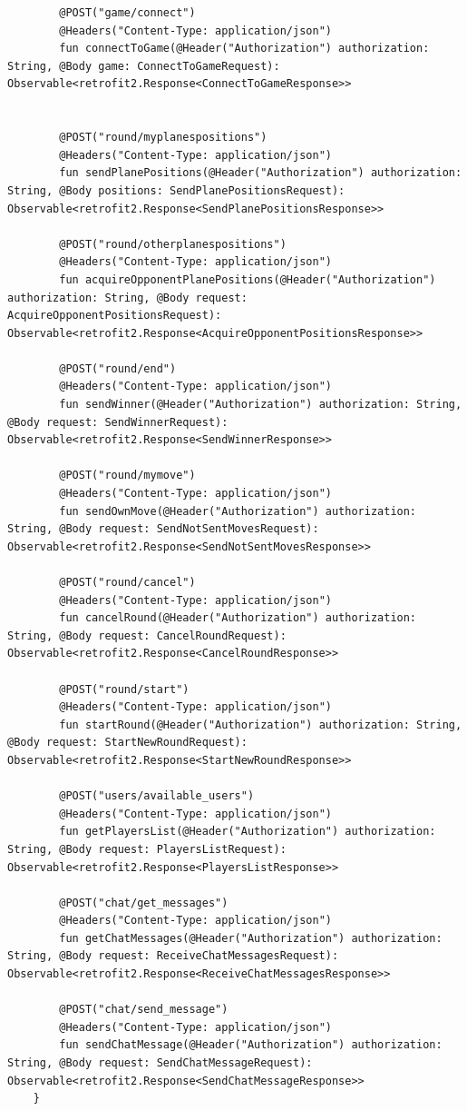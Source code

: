 \begin{lstlisting}
		@POST("game/connect")
		@Headers("Content-Type: application/json")
		fun connectToGame(@Header("Authorization") authorization: String, @Body game: ConnectToGameRequest): Observable<retrofit2.Response<ConnectToGameResponse>>
		
		
		@POST("round/myplanespositions")
		@Headers("Content-Type: application/json")
		fun sendPlanePositions(@Header("Authorization") authorization: String, @Body positions: SendPlanePositionsRequest): Observable<retrofit2.Response<SendPlanePositionsResponse>>
		
		@POST("round/otherplanespositions")
		@Headers("Content-Type: application/json")
		fun acquireOpponentPlanePositions(@Header("Authorization") authorization: String, @Body request: AcquireOpponentPositionsRequest): Observable<retrofit2.Response<AcquireOpponentPositionsResponse>>
		
		@POST("round/end")
		@Headers("Content-Type: application/json")
		fun sendWinner(@Header("Authorization") authorization: String, @Body request: SendWinnerRequest): Observable<retrofit2.Response<SendWinnerResponse>>
		
		@POST("round/mymove")
		@Headers("Content-Type: application/json")
		fun sendOwnMove(@Header("Authorization") authorization: String, @Body request: SendNotSentMovesRequest): Observable<retrofit2.Response<SendNotSentMovesResponse>>
		
		@POST("round/cancel")
		@Headers("Content-Type: application/json")
		fun cancelRound(@Header("Authorization") authorization: String, @Body request: CancelRoundRequest): Observable<retrofit2.Response<CancelRoundResponse>>
		
		@POST("round/start")
		@Headers("Content-Type: application/json")
		fun startRound(@Header("Authorization") authorization: String, @Body request: StartNewRoundRequest): Observable<retrofit2.Response<StartNewRoundResponse>>
		
		@POST("users/available_users")
		@Headers("Content-Type: application/json")
		fun getPlayersList(@Header("Authorization") authorization: String, @Body request: PlayersListRequest): Observable<retrofit2.Response<PlayersListResponse>>
		
		@POST("chat/get_messages")
		@Headers("Content-Type: application/json")
		fun getChatMessages(@Header("Authorization") authorization: String, @Body request: ReceiveChatMessagesRequest): Observable<retrofit2.Response<ReceiveChatMessagesResponse>>
		
		@POST("chat/send_message")
		@Headers("Content-Type: application/json")
		fun sendChatMessage(@Header("Authorization") authorization: String, @Body request: SendChatMessageRequest): Observable<retrofit2.Response<SendChatMessageResponse>>
	}
\end{lstlisting}

